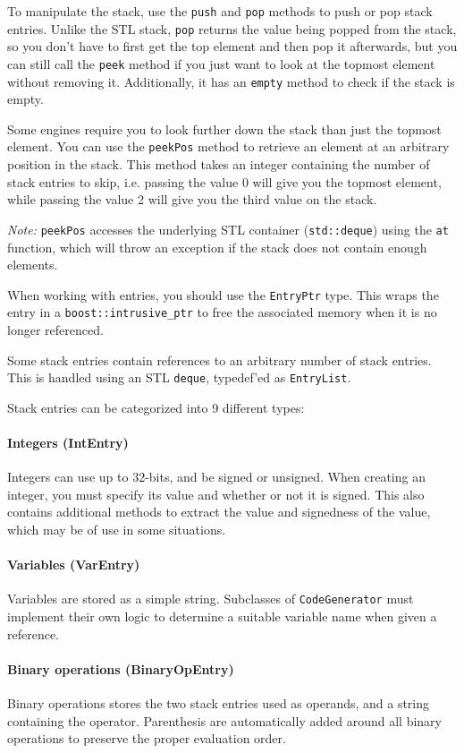 To manipulate the stack, use the \verb+push+ and \verb+pop+ methods to push or pop stack entries. Unlike the STL stack, \verb+pop+ returns the value being popped from the stack, so you don't have to first get the top element and then pop it afterwards, but you can still call the \verb+peek+ method if you just want to look at the topmost element without removing it. Additionally, it has an \verb+empty+ method to check if the stack is empty.

Some engines require you to look further down the stack than just the topmost element. You can use the \verb+peekPos+ method to retrieve an element at an arbitrary position in the stack. This method takes an integer containing the number of stack entries to skip, i.e. passing the value 0 will give you the topmost element, while passing the value 2 will give you the third value on the stack.

\emph{Note:} \verb+peekPos+ accesses the underlying STL container (\verb+std::deque+) using the \verb+at+ function, which will throw an exception if the stack does not contain enough elements.

When working with entries, you should use the \verb+EntryPtr+ type. This wraps the entry in a \verb+boost::intrusive_ptr+ to free the associated memory when it is no longer referenced.

Some stack entries contain references to an arbitrary number of stack entries. This is handled using an STL \verb+deque+, typedef'ed as \verb+EntryList+.

Stack entries can be categorized into 9 different types:

\paragraph{Integers (IntEntry)}
Integers can use up to 32-bits, and be signed or unsigned. When creating an integer, you must specify its value and whether or not it is signed. This also contains additional methods to extract the value and signedness of the value, which may be of use in some situations.

\paragraph{Variables (VarEntry)}
Variables are stored as a simple string. Subclasses of \verb+CodeGenerator+ must implement their own logic to determine a suitable variable name when given a reference.

\paragraph{Binary operations (BinaryOpEntry)}
Binary operations stores the two stack entries used as operands, and a string containing the operator. Parenthesis are automatically added around all binary operations to preserve the proper evaluation order.

